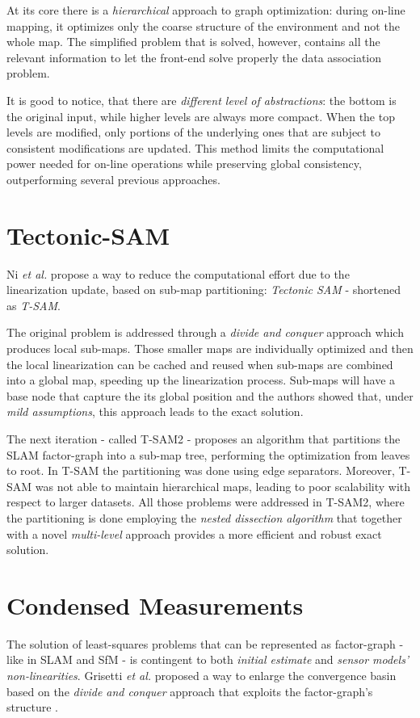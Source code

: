 At its core there is a \textit{hierarchical} approach to graph optimization: during on-line mapping, it optimizes only the coarse structure of the environment and not the whole map. The simplified problem that is solved, however, contains all the relevant information to let the front-end solve properly the data association problem. 

It is good to notice, that there are \textit{different level of abstractions}: the bottom is the original input, while higher levels are always more compact. When the top levels are modified, only portions of the underlying ones that are subject to consistent modifications are updated. This method limits the computational power needed for on-line operations while preserving global consistency, outperforming several previous approaches.

\section{Tectonic-SAM}\label{sec:tsam}
Ni \textit{et al.} propose a way to reduce the computational effort due to the linearization update, based on sub-map partitioning: \textit{Tectonic SAM} \cite{ni2007tectonic} - shortened as \textit{T-SAM}.

The original problem is addressed through a \textit{divide and conquer} approach which produces local sub-maps. Those smaller maps are individually optimized and then the local linearization can be cached and reused when sub-maps are combined into a global map, speeding up the linearization process. Sub-maps will have a base node that capture the its global position and the authors showed that, under \textit{mild assumptions}, this approach leads to the exact solution. 

The next iteration - called T-SAM2 \cite{ni2010nestedDiss} - proposes an algorithm that partitions the SLAM factor-graph into a sub-map tree, performing the optimization from leaves to root. In T-SAM the partitioning was done using edge separators. Moreover, T-SAM was not able to maintain hierarchical maps, leading to poor scalability with respect to larger datasets. All those problems were addressed in T-SAM2, where the partitioning is done employing the \textit{nested dissection algorithm} that together with a novel \textit{multi-level} approach provides a more efficient and robust exact solution.

\section{Condensed Measurements}\label{sec:cmeas}
The solution of least-squares problems that can be represented as factor-graph - like in SLAM and SfM - is contingent to both \textit{initial estimate} and \textit{sensor models' non-linearities}. Grisetti \textit{et al.} proposed a way to enlarge the convergence basin based on the \textit{divide and conquer} approach that exploits the factor-graph's structure \cite{grisetti2012condensed}. 

